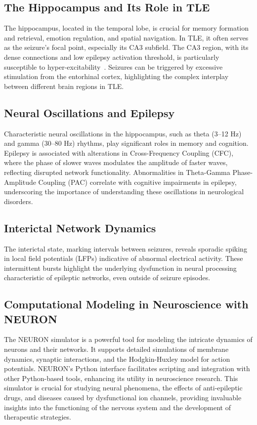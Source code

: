 \subsection{The Hippocampus and Its Role in TLE}
The hippocampus, located in the temporal lobe, is crucial for memory formation 
and retrieval, emotion regulation, and spatial navigation. In TLE, it often 
serves as the seizure's focal point, especially its CA3 subfield. The CA3 region, 
with its dense connections and low epilepsy activation threshold, is particularly 
susceptible to hyper-excitability~\parencite{witterIntrinsicExtrinsicWiring2007}. Seizures can be 
triggered by excessive stimulation from the entorhinal cortex, highlighting the 
complex interplay between different brain regions in TLE\@.

\subsection{Neural Oscillations and Epilepsy}
Characteristic neural oscillations in the hippocampus, such as theta (3--12 Hz) 
and gamma (30--80 Hz) rhythms, play significant roles in memory and cognition. 
Epilepsy is associated with alterations in Cross-Frequency Coupling (CFC), where 
the phase of slower waves modulates the amplitude of faster waves, reflecting 
disrupted network functionality. Abnormalities in Theta-Gamma Phase-Amplitude 
Coupling (PAC) correlate with cognitive impairments in epilepsy, underscoring 
the importance of understanding these oscillations in neurological disorders.

\subsection{Interictal Network Dynamics}
The interictal state, marking intervals between seizures, reveals sporadic 
spiking in local field potentials (LFPs) indicative of abnormal electrical 
activity. These intermittent bursts highlight the underlying dysfunction in 
neural processing characteristic of epileptic networks, even outside of 
seizure episodes.

\subsection{Computational Modeling in Neuroscience with NEURON}
The NEURON simulator is a powerful tool for modeling the intricate dynamics 
of neurons and their networks. It supports detailed simulations of membrane 
dynamics, synaptic interactions, and the Hodgkin-Huxley model for action 
potentials. NEURON's Python interface facilitates scripting and integration 
with other Python-based tools, enhancing its utility in neuroscience research.
This simulator is crucial for studying neural phenomena, the effects of 
anti-epileptic drugs, and diseases caused by dysfunctional ion channels, 
providing invaluable insights into the functioning of the nervous system 
and the development of therapeutic strategies.


